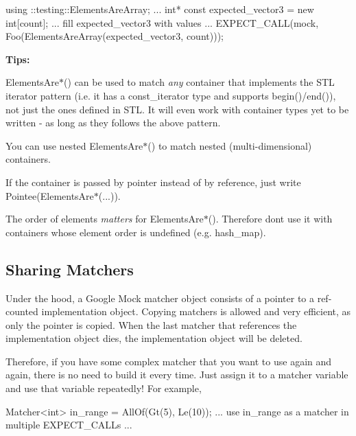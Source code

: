 \begin{DoxyCode}
using ::testing::ElementsAreArray;
...
  \textcolor{keywordtype}{int}* \textcolor{keyword}{const} expected\_vector3 = \textcolor{keyword}{new} \textcolor{keywordtype}{int}[count];
  ... fill expected\_vector3 with values ...
  EXPECT\_CALL(mock, Foo(ElementsAreArray(expected\_vector3, count)));
\end{DoxyCode}


{\bfseries Tips\+:}


\begin{DoxyItemize}
\item {\ttfamily Elements\+Are$\ast$()} can be used to match {\itshape any} container that implements the S\+TL iterator pattern (i.\+e. it has a {\ttfamily const\+\_\+iterator} type and supports {\ttfamily begin()/end()}), not just the ones defined in S\+TL. It will even work with container types yet to be written -\/ as long as they follows the above pattern.
\item You can use nested {\ttfamily Elements\+Are$\ast$()} to match nested (multi-\/dimensional) containers.
\item If the container is passed by pointer instead of by reference, just write {\ttfamily Pointee(Elements\+Are$\ast$(...))}.
\item The order of elements {\itshape matters} for {\ttfamily Elements\+Are$\ast$()}. Therefore don\textquotesingle{}t use it with containers whose element order is undefined (e.\+g. {\ttfamily hash\+\_\+map}).
\end{DoxyItemize}

\subsection*{Sharing Matchers}

Under the hood, a Google Mock matcher object consists of a pointer to a ref-\/counted implementation object. Copying matchers is allowed and very efficient, as only the pointer is copied. When the last matcher that references the implementation object dies, the implementation object will be deleted.

Therefore, if you have some complex matcher that you want to use again and again, there is no need to build it every time. Just assign it to a matcher variable and use that variable repeatedly! For example,


\begin{DoxyCode}
Matcher<int> in\_range = AllOf(Gt(5), Le(10));
... use in\_range as a matcher in multiple EXPECT\_CALLs ...
\end{DoxyCode}


